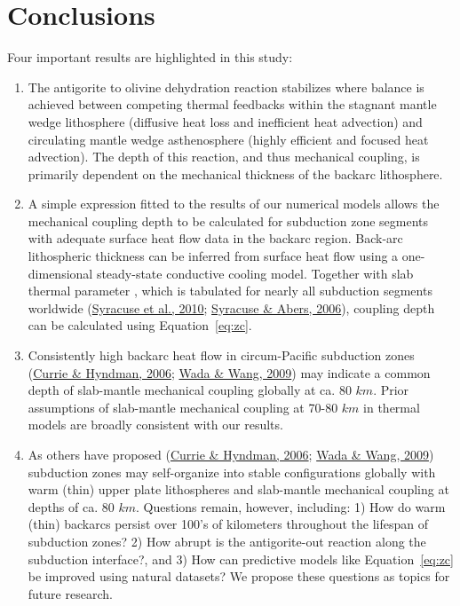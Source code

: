 \documentclass[draft,linenumbers]{agujournal2018}
\begin{document}
\hypertarget{conclusions}{%
\section{Conclusions}\label{conclusions}}

Four important results are highlighted in this study:

\begin{enumerate}
\def\labelenumi{\arabic{enumi}.}
\item
  The antigorite to olivine dehydration reaction stabilizes where
  balance is achieved between competing thermal feedbacks within the
  stagnant mantle wedge lithosphere (diffusive heat loss and inefficient
  heat advection) and circulating mantle wedge asthenosphere (highly
  efficient and focused heat advection). The depth of this reaction, and
  thus mechanical coupling, is primarily dependent on the mechanical
  thickness of the backarc lithosphere.
\item
  A simple expression fitted to the results of our numerical models
  allows the mechanical coupling depth to be calculated for subduction
  zone segments with adequate surface heat flow data in the backarc
  region. Back-arc lithospheric thickness can be inferred from surface
  heat flow using a one-dimensional steady-state conductive cooling
  model. Together with slab thermal parameter , which is tabulated for
  nearly all subduction segments worldwide
  (\protect\hyperlink{ref-Syracuse2010}{Syracuse et al., 2010};
  \protect\hyperlink{ref-Syracuse2006}{Syracuse \& Abers, 2006}),
  coupling depth can be calculated using Equation~\ref{eq:zc}.
\item
  Consistently high backarc heat flow in circum-Pacific subduction zones
  (\protect\hyperlink{ref-Currie2006}{Currie \& Hyndman, 2006};
  \protect\hyperlink{ref-Wada2009}{Wada \& Wang, 2009}) may indicate a
  common depth of slab-mantle mechanical coupling globally at ca. 80
  \(km\). Prior assumptions of slab-mantle mechanical coupling at 70-80
  \(km\) in thermal models are broadly consistent with our results.
\item
  As others have proposed (\protect\hyperlink{ref-Currie2006}{Currie \&
  Hyndman, 2006}; \protect\hyperlink{ref-Wada2009}{Wada \& Wang, 2009})
  subduction zones may self-organize into stable configurations globally
  with warm (thin) upper plate lithospheres and slab-mantle mechanical
  coupling at depths of ca. 80 \(km\). Questions remain, however,
  including: 1) How do warm (thin) backarcs persist over 100's of
  kilometers throughout the lifespan of subduction zones? 2) How abrupt
  is the antigorite-out reaction along the subduction interface?, and 3)
  How can predictive models like Equation~\ref{eq:zc} be improved using
  natural datasets? We propose these questions as topics for future
  research.
\end{enumerate}
\end{document}
